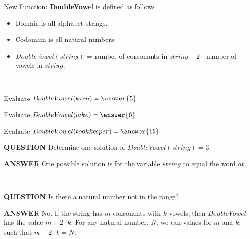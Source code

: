 \documentclass{ximera}
\begin{document}
\begin{exploration}
New Function: \textbf{DoubleVowel} is defined as follows \\
\begin{itemize}
\item Domain is all alphabet strings.
\item Codomain is all natural numbers.
\item $DoubleVowel(string)$ = number of consonants in $string + 2 \cdot$ number of vowels in $string$.
\end{itemize}

\quad \\




\begin{question}
Evaluate  $DoubleVowel(barn) = \answer{5}$
\end{question}


\begin{question}
Evaluate  $DoubleVowel(lake) = \answer{6}$
\end{question}


\begin{question}
Evaluate  $DoubleVowel(bookkeeper) = \answer{15}$
\end{question}


\begin{dialogue}
\item[\textbf{QUESTION}] Determine one solution of $DoubleVowel(string) = 3$.
\item[\textbf{ANSWER}] One possible solution is for the variable $string$ to equal the word $at$.
\end{dialogue}

\quad \\

\begin{dialogue}
\item[\textbf{QUESTION}] Is there a natural number not in the range?
\item[\textbf{ANSWER}] No. If the string has $m$ consonants with $k$ vowels, then $DoubleVowel$ has the value $m + 2 \cdot k$. 
For any natural number, $N$, we can values for $m$ and $k$, such that $m + 2 \cdot k = N$.
\end{dialogue}







\end{exploration}
\end{document}

